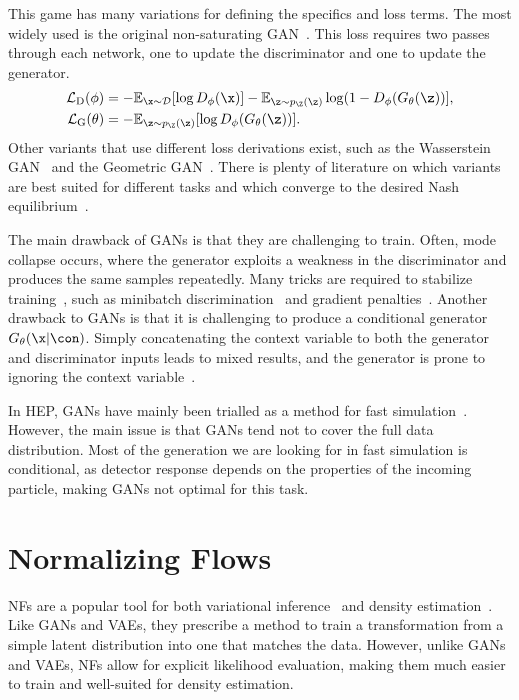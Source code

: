This game has many variations for defining the specifics and loss terms.
The most widely used is the original non-saturating GAN~\cite{GenerativeAdversarialNetworks}.
This loss requires two passes through each network, one to update the discriminator and one to update the generator.
\begin{align}
    \mathcal{L}_{\text{D}}(\phi) &= -\mathbb{E}_{\x \sim \mathcal{D}}[\log D_{\phi}(\x)] - \mathbb{E}_{\z \sim p_\Z(\z)}\log(1 - D_{\phi}(G_{\theta}(\z))], \\
    \mathcal{L}_{\text{G}}(\theta) &= -\mathbb{E}_{\z \sim p_\Z(\z)}[\log D_{\phi}(G_{\theta}(\z))].
\end{align}
Other variants that use different loss derivations exist, such as the Wasserstein GAN~\cite{WGAN1} and the Geometric GAN~\cite{GeometricGAN}.
There is plenty of literature on which variants are best suited for different tasks and which converge to the desired Nash equilibrium~\cite{WhichTrainingMethods}.

The main drawback of GANs is that they are challenging to train.
Often, mode collapse occurs, where the generator exploits a weakness in the discriminator and produces the same samples repeatedly.
Many tricks are required to stabilize training~\cite{WhichTrainingMethods}, such as minibatch discrimination~\cite{ProGAN} and gradient penalties~\cite{WGAN}.
Another drawback to GANs is that it is challenging to produce a conditional generator $G_\theta(\x|\con)$.
Simply concatenating the context variable to both the generator and discriminator inputs leads to mixed results, and the generator is prone to ignoring the context variable~\cite{cGAN}.

In HEP, GANs have mainly been trialled as a method for fast simulation~\cite{MPGAN, GAPT, CaloGAN, EPICGAN}.
However, the main issue is that GANs tend not to cover the full data distribution.
Most of the generation we are looking for in fast simulation is conditional, as detector response depends on the properties of the incoming particle, making GANs not optimal for this task.

\section{Normalizing Flows}
\label{sec:flows}

NFs are a popular tool for both variational inference~\cite{VariationalInferenceNormalizing, NormalizingFlowsProbabilistic}
and density estimation~\cite{NICENonlinearIndependent}.
Like GANs and VAEs, they prescribe a method to train a transformation from a simple latent distribution into one that matches the data.
However, unlike GANs and VAEs, NFs allow for explicit likelihood evaluation, making them much easier to train and well-suited for density estimation.

